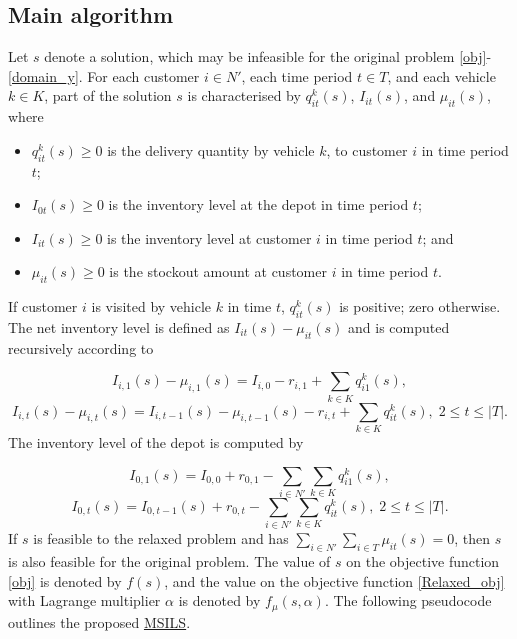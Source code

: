 \documentclass{article}
\begin{document}
\subsection{Main algorithm} \label{sec:main algorithm}


Let $s$ denote a solution, which may be infeasible for the original problem \eqref{obj}-\eqref{domain_y}. For each customer $i\in N'$, each time period $t\in T$, and each vehicle $k\in K$, part of the solution $s$ is characterised by $q^k_{it}(s)$, $I_{it}(s)$, and $\mu_{it}(s)$, where
\begin{itemize}
    \item $q^k_{it}(s)\geq 0$ is the delivery quantity by vehicle $k$, to customer $i$ in time period $t$;
    \item $I_{0t}(s) \geq 0$ is the inventory level at the depot in time period $t$;
    \item $I_{it}(s) \geq 0$ is the inventory level at customer $i$ in time period $t$; and
    \item $\mu_{it}(s) \geq 0$ is the stockout amount at customer $i$ in time period $t$.
\end{itemize}
If customer $i$ is visited by vehicle $k$ in time $t$, $q^k_{it}(s)$ is positive; zero otherwise. The net inventory level is defined as $I_{it}(s) - \mu_{it}(s)$ and is computed recursively according to

\begin{equation}\label{initial I0}
I_{i,1}(s) - \mu_{i,1}(s)= I_{i,0} - r_{i,1} + \sum_{k\in K}q^k_{i1}(s),
\end{equation}
\begin{equation}\label{Initial I1}
I_{i,t}(s)-\mu_{i,t}(s)= I_{i,t-1}(s) -\mu_{i,t-1}(s) - r_{i,t} + \sum_{k\in K}q^k_{it}(s),\; 2\leq t\leq |T|.
\end{equation}
The inventory level of the depot is computed by 

\begin{equation}\label{initial I0 depot}
I_{0,1}(s) = I_{0,0} + r_{0,1} - \sum_{i\in N'}\sum_{k\in K}q^k_{i1}(s),
\end{equation}
\begin{equation}\label{Initial I1 depot}
I_{0,t}(s)= I_{0,t-1}(s) + r_{0,t} - \sum_{i\in N'}\sum_{k\in K}q^k_{it}(s),\; 2\leq t\leq |T|.
\end{equation}
If $s$ is feasible to the relaxed problem and has $\sum_{i\in N'} \sum_{i\in T} \mu_{it}(s) = 0$, then $s$ is also feasible for the original problem. The value of $s$ on the objective function \eqref{obj} is denoted by $f(s)$, and the value on the objective function \eqref{Relaxed_obj} with Lagrange multiplier $\alpha$ is denoted by $f_{\mu}(s, \alpha)$. The following pseudocode outlines the proposed \hyperref[alg:MSILS]{MSILS}. 
\end{document}
